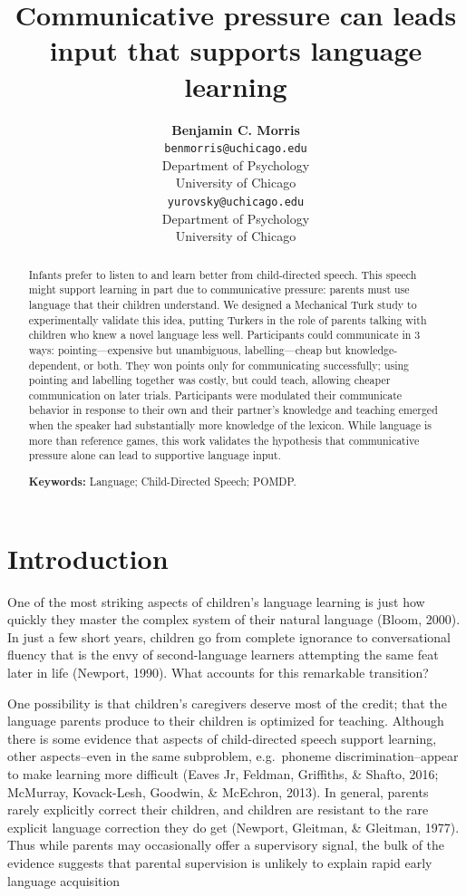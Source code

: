 \documentclass[10pt, letterpaper]{article}
\title{Communicative pressure can leads input that supports language learning}
\author{{\large \bf Benjamin C. Morris} \\ \texttt{benmorris@uchicago.edu} \\ Department of Psychology \\ University of Chicago \And {\large \bf Daniel Yurovsky} \\ \texttt{yurovsky@uchicago.edu} \\ Department of Psychology \\ University of Chicago}
\begin{document}
\maketitle

\begin{abstract}
Infants prefer to listen to and learn better from child-directed speech.
This speech might support learning in part due to communicative
pressure: parents must use language that their children understand. We
designed a Mechanical Turk study to experimentally validate this idea,
putting Turkers in the role of parents talking with children who knew a
novel language less well. Participants could communicate in 3 ways:
pointing---expensive but unambiguous, labelling---cheap but
knowledge-dependent, or both. They won points only for communicating
successfully; using pointing and labelling together was costly, but
could teach, allowing cheaper communication on later trials.
Participants were modulated their communicate behavior in response to
their own and their partner's knowledge and teaching emerged when the
speaker had substantially more knowledge of the lexicon. While language
is more than reference games, this work validates the hypothesis that
communicative pressure alone can lead to supportive language input.

\textbf{Keywords:}
Language; Child-Directed Speech; POMDP.
\end{abstract}

\section{Introduction}\label{introduction}

One of the most striking aspects of children's language learning is just
how quickly they master the complex system of their natural language
(Bloom, 2000). In just a few short years, children go from complete
ignorance to conversational fluency that is the envy of second-language
learners attempting the same feat later in life (Newport, 1990). What
accounts for this remarkable transition?

One possibility is that children's caregivers deserve most of the
credit; that the language parents produce to their children is optimized
for teaching. Although there is some evidence that aspects of
child-directed speech support learning, other aspects--even in the same
subproblem, e.g.~phoneme discrimination--appear to make learning more
difficult (Eaves Jr, Feldman, Griffiths, \& Shafto, 2016; McMurray,
Kovack-Lesh, Goodwin, \& McEchron, 2013). In general, parents rarely
explicitly correct their children, and children are resistant to the
rare explicit language correction they do get (Newport, Gleitman, \&
Gleitman, 1977). Thus while parents may occasionally offer a supervisory
signal, the bulk of the evidence suggests that parental supervision is
unlikely to explain rapid early language acquisition
\end{document}
